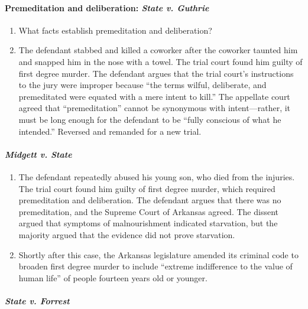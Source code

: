 \paragraph{Premeditation and deliberation: \emph{State v. Guthrie}}

\begin{enumerate}
    \item What facts establish premeditation and deliberation?
    \item The defendant stabbed and killed a coworker after the coworker taunted him and snapped him in the nose with a towel. The trial court found him guilty of first degree murder. The defendant argues that the trial court's instructions to the jury were improper because ``the terms wilful, deliberate, and premeditated were equated with a mere intent to kill.'' The appellate court agreed that ``premeditation'' cannot be synonymous with intent---rather, it must be long enough for the defendant to be ``fully conscious of what he intended.'' Reversed and remanded for a new trial.
\end{enumerate}

\paragraph{\emph{Midgett v. State}}

\begin{enumerate}
    \item The defendant repeatedly abused his young son, who died from the injuries. The trial court found him guilty of first degree murder, which required premeditation and deliberation. The defendant argues that there was no premeditation, and the Supreme Court of Arkansas agreed. The dissent argued that symptoms of malnourishment indicated starvation, but the majority argued that the evidence did not prove starvation.
    \item Shortly after this case, the Arkansas legislature amended its criminal code to broaden first degree murder to include ``extreme indifference to the value of human life'' of people fourteen years old or younger.
\end{enumerate}

\paragraph{\emph{State v. Forrest}}

